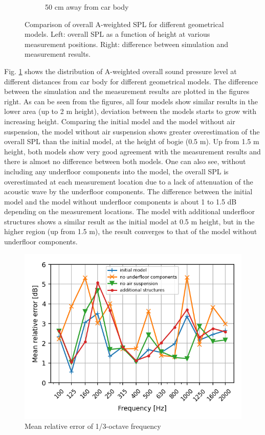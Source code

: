\begin{figure}[H]
\begin{subfigure}[b]{\textwidth}
		\caption{50 cm away from car body}
	\end{subfigure}
	\caption{Comparison of overall A-weighted SPL for different geometrical models. Left: overall SPL as a function of height at various measurement positions. Right: difference between simulation and measurement results.}
	\label{fig:overall_SPL_geometry}
\end{figure}

Fig. \ref{fig:overall_SPL_geometry} shows the distribution of  A-weighted overall sound pressure level at different distances from car body for different geometrical models. The difference between the simulation and the measurement results are plotted in the figures right. As can be seen from the figures, all four models show similar results in the lower area (up to 2 m height), deviation between the models starts to grow with increasing height. Comparing the initial model and the model without air suspension, the model without air suspension shows greater overestimation of the overall SPL than the initial model, at the height of bogie (0.5 m). Up from 1.5 m height, both models show very good agreement with the measurement results and there is almost no difference between both models. One can also see, without including any underfloor components into the model, the overall SPL is overestimated at each measurement location due to a lack of attenuation of the acoustic wave by the underfloor components. The difference between the initial model and the model without underfloor components is about 1 to 1.5 dB depending on the measurement locations. The model with additional underfloor structures shows a similar result as the initial model at 0.5 m height, but in the higher region (up from 1.5 m), the result converges to that of the model without underfloor components.

\begin{figure}[H]
	\centering
	\includegraphics[width=0.7\linewidth]{fig/chap5/geometry_variation/freq_spectrum/average_gap.png}
	\caption{Mean relative error of 1/3-octave frequency}
	\label{fig:gap_freq_spectrum_geometry}
\end{figure}

